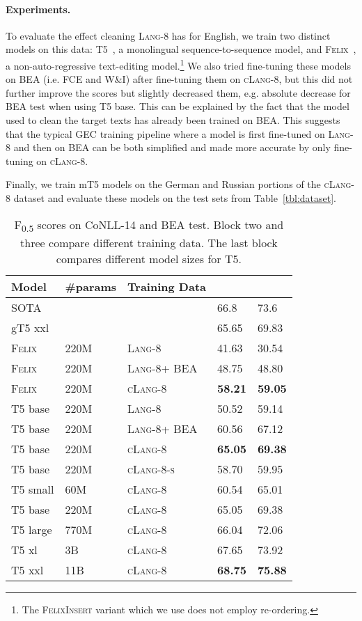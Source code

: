 \documentclass[11pt,a4paper]{article}
\newcommand{\lang}[0]{{\scshape Lang-8}\xspace}
\newcommand{\clangg}[0]{{\scshape cLang-8}\xspace}
\newcommand{\clangs}[0]{{\scshape cLang-8-s}\xspace}
\newcommand{\beatrain}[0]{BEA\xspace}
\newcommand{\INSERTION}[0]{{\scshape Felix}\xspace} \newcommand{\fzero}[0]{F\textsubscript{0.5}\xspace}
\newcommand{\conll}[0]{CoNLL-14\xspace}
\newcommand{\beatest}[0]{BEA test\xspace}
\newcommand*\rot{\rotatebox{60}}
\begin{document}
\paragraph*{Experiments.}
To evaluate the effect cleaning \lang has for English, we train two distinct models on this data: T5~\cite{t5}, a monolingual sequence-to-sequence model, and \INSERTION~\cite{mallinson-etal-2020-felix}, a non-auto-regressive text-editing model.\footnote{The \textsc{FelixInsert} variant which we use does not employ re-ordering.}
We also tried fine-tuning these models on \beatrain{} (i.e. FCE and W\&I) after fine-tuning them on \clangg, but this did not further improve the scores but slightly decreased them, e.g.  absolute decrease for BEA test when using T5 base.
This can be explained by the fact that the model used to clean the target texts has already been trained on \beatrain.
This suggests that the typical GEC training pipeline where a model is first fine-tuned on \lang and then on \beatrain{} can be both simplified and made more accurate by only fine-tuning on \clangg.

Finally, we train mT5 models on the German and Russian portions of the \clangg dataset and evaluate these models on the test sets from Table~\ref{tbl:dataset}.

\begin{table}[t]
\footnotesize
\setlength{\tabcolsep}{5pt}
\begin{tabularx}{\columnwidth}{llXll}
\toprule
Model & \#params & Training Data & \rot{\conll}  & \rot{\beatest}  \\
\midrule
SOTA  &  & & 66.8 & 73.6  \\ 
gT5 xxl & & & 65.65 & 69.83 \\
\midrule
\INSERTION  & 220M & \lang & 41.63 &  30.54 \\
\INSERTION  & 220M & \lang + \textsc{BEA} & 48.75 & 48.80  \\ 
\INSERTION  & 220M & \clangg & \textbf{58.21} & \textbf{59.05} \\ 
\midrule
T5 base & 220M & \lang & 50.52 & 59.14	 \\
T5 base & 220M & \lang + \textsc{BEA}  & 60.56 & 67.12	 \\
T5 base & 220M & \clangg & \textbf{65.05} & \textbf{69.38} \\ 
T5 base & 220M & \clangs & 58.70 & 59.95 \\ 
\midrule
T5 small & 60M & \clangg & 60.54 & 65.01 \\ 
T5 base  & 220M & \clangg & 65.05 &  69.38	 \\ 
T5 large & 770M & \clangg & 66.04 & 72.06 \\ 
T5 xl    & 3B & \clangg & 67.65 & 73.92 \\ 
T5 xxl   & 11B & \clangg & \textbf{68.75} & \textbf{75.88} \\ 
\bottomrule
\end{tabularx}
\caption{\fzero scores on \conll and \beatest. Block two and three compare different training data. The last block compares different model sizes for T5.}
\label{tbl:clang8-results}
\end{table}
\end{document}
